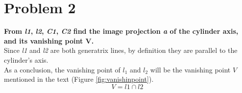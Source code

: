 \documentclass[a4paper, 11pt, oneside, openright, english]{book}
\begin{document}
\section{Problem 2}
\textbf{From \textit{l1}, \textit{l2}, \textit{C1}, \textit{C2} find the image projection \textit{a} of the cylinder axis, and its vanishing point V.}\\
Since \textit{l1} and \textit{l2} are both generatrix lines, by definition they are parallel to the cylinder's axis.\\
As a conclusion, the vanishing point of \textit{$l_1$} and \textit{$l_2$} will be the vanishing point $V$ mentioned in the text (Figure \ref{fig:vanishinpoint}).\\
\begin{equation}
    V = l1 \cap l2 \label{eq:V}
\end{equation}
\end{document}
